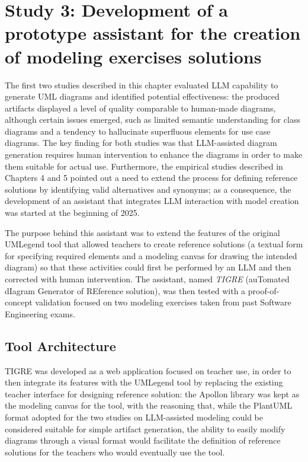 \section{Study 3: Development of a prototype assistant for the creation of modeling exercises solutions}

The first two studies described in this chapter evaluated LLM capability to generate UML diagrams and identified potential effectiveness: the produced artifacts displayed a level of quality comparable to human-made diagrams, although certain issues emerged, such as limited semantic understanding for class diagrams and a tendency to hallucinate superfluous elements for use case diagrams. The key finding for both studies was that LLM-assisted diagram generation requires human intervention to enhance the diagrams in order to make them suitable for actual use. Furthermore, the empirical studies described in Chapters 4 and 5 pointed out a need to extend the process for defining reference solutions by identifying valid alternatives and synonyms; as a consequence, the development of an assistant that integrates LLM interaction with model creation was started at the beginning of 2025.

The purpose behind this assistant was to extend the features of the original UMLegend tool that allowed teachers to create reference solutions (a textual form for specifying required elements and a modeling canvas for drawing the intended diagram) so that these activities could first be performed by an LLM and then corrected with human intervention. The assistant, named \textit{TIGRE} (auTomated dIagram Generator of REference solution), was then tested with a proof-of-concept validation focused on two modeling exercises taken from past Software Engineering exams.


\subsection{Tool Architecture}

TIGRE was developed as a web application focused on teacher use, in order to then integrate its features with the UMLegend tool by replacing the existing teacher interface for designing reference solution: the Apollon library was kept as the modeling canvas for the tool, with the reasoning that, while the PlantUML format adopted for the two studies on LLM-assisted modeling could be considered suitable for simple artifact generation, the ability to easily modify diagrams through a visual format would facilitate the definition of reference solutions for the teachers who would eventually use the tool.

